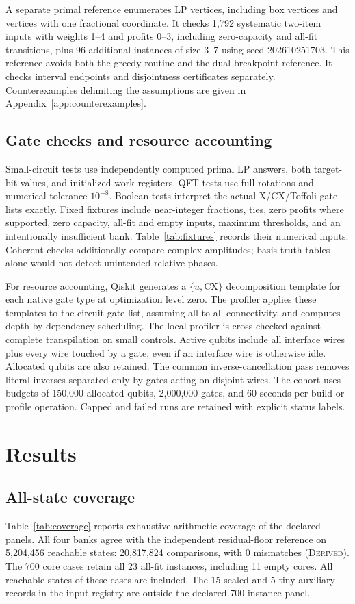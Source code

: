\documentclass[referee,pdflatex,sn-mathphys-num]{sn-jnl}
\theoremstyle{thmstyleone}
\theoremstyle{thmstyletwo}
\begin{document}
A separate primal reference enumerates LP vertices, including box vertices and vertices with one fractional coordinate. It checks 1,792 systematic two-item inputs with weights 1--4 and profits 0--3, including zero-capacity and all-fit transitions, plus 96 additional instances of size 3--7 using seed 202610251703. This reference avoids both the greedy routine and the dual-breakpoint reference. It checks interval endpoints and disjointness certificates separately. Counterexamples delimiting the assumptions are given in Appendix~\ref{app:counterexamples}.

\subsection{Gate checks and resource accounting}
Small-circuit tests use independently computed primal LP answers, both target-bit values, and initialized work registers. QFT tests use full rotations and numerical tolerance $10^{-8}$. Boolean tests interpret the actual X/CX/Toffoli gate lists exactly. Fixed fixtures include near-integer fractions, ties, zero profits where supported, zero capacity, all-fit and empty inputs, maximum thresholds, and an intentionally insufficient bank. Table~\ref{tab:fixtures} records their numerical inputs. Coherent checks additionally compare complex amplitudes; basis truth tables alone would not detect unintended relative phases.

For resource accounting, Qiskit generates a $\{u,\mathrm{CX}\}$ decomposition template for each native gate type at optimization level zero. The profiler applies these templates to the circuit gate list, assuming all-to-all connectivity, and computes depth by dependency scheduling. The local profiler is cross-checked against complete transpilation on small controls. Active qubits include all interface wires plus every wire touched by a gate, even if an interface wire is otherwise idle. Allocated qubits are also retained. The common inverse-cancellation pass removes literal inverses separated only by gates acting on disjoint wires. The cohort uses budgets of 150,000 allocated qubits, 2,000,000 gates, and 60 seconds per build or profile operation. Capped and failed runs are retained with explicit status labels.

\section{Results}\label{sec:results}
\subsection{All-state coverage}
Table~\ref{tab:coverage} reports exhaustive arithmetic coverage of the declared panels. All four banks agree with the independent residual-floor reference on 5,204,456 reachable states: 20,817,824 comparisons, with 0 mismatches (\textsc{Derived}). The 700 core cases retain all 23 all-fit instances, including 11 empty cores. All reachable states of these cases are included. The 15 scaled and 5 tiny auxiliary records in the input registry are outside the declared 700-instance panel.
\end{document}
